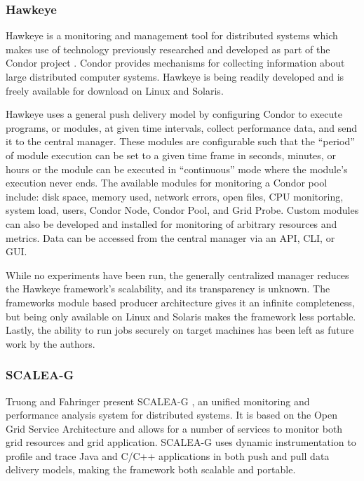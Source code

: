 \subsubsection{Hawkeye}

Hawkeye \cite{hawkeye} is a monitoring and management tool for distributed systems which makes use of technology
previously researched and developed as part of the Condor project \cite{litzkow1988}. Condor provides mechanisms for
collecting information about large distributed computer systems. Hawkeye is being readily developed and is freely
available for download on Linux and Solaris.

Hawkeye uses a general push delivery model by configuring Condor to execute programs, or modules, at given time
intervals, collect performance data, and send it to the central manager. These modules are configurable such that the
``period'' of module execution can be set to a given time frame in seconds, minutes, or hours or the module can be
executed in ``continuous'' mode where the module's execution never ends. The available modules for monitoring a Condor
pool include: disk space, memory used, network errors, open files, CPU monitoring, system load, users, Condor Node,
Condor Pool, and Grid Probe. Custom modules can also be developed and installed for monitoring of arbitrary resources
and metrics. Data can be accessed from the central manager via an API, CLI, or GUI.

While no experiments have been run, the generally centralized manager reduces the Hawkeye framework's scalability, and
its transparency is unknown. The frameworks module based producer architecture gives it an infinite completeness, but
being only available on Linux and Solaris makes the framework less portable. Lastly, the ability to run jobs securely on
target machines has been left as future work by the authors.

\subsubsection{SCALEA-G}

Truong and Fahringer present SCALEA-G \cite{truong2004}, an unified monitoring and performance analysis system for
distributed systems. It is based on the Open Grid Service Architecture \cite{foster2002} and allows for a number of
services to monitor both grid resources and grid application. SCALEA-G uses dynamic instrumentation to profile and trace
Java and C/C++ applications in both push and pull data delivery models, making the framework both scalable and portable.

